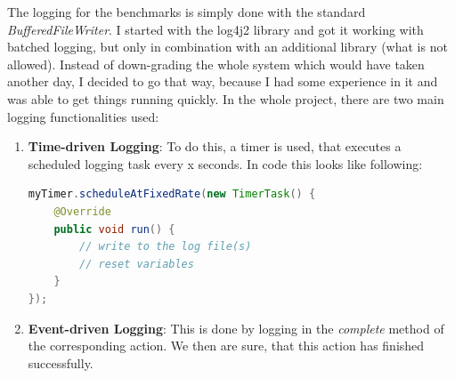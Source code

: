 \documentclass[11pt]{article}
\begin{document}
 The logging for the benchmarks is simply done with the standard \textit{BufferedFileWriter}. I started with the log4j2 library and got it working with batched logging, but only in combination with an additional library (what is not allowed). Instead of down-grading the whole system which would have taken another day, I decided to go that way, because I had some experience in it and was able to get things running quickly. In the whole project, there are two main logging functionalities used:
 \begin{enumerate}
 	\item \textbf{Time-driven Logging}: To do this, a timer is used, that executes a scheduled logging task every x seconds. In code this looks like following:
\begin{lstlisting}[basicstyle=\small, language=Java]
myTimer.scheduleAtFixedRate(new TimerTask() {
    @Override
    public void run() {
        // write to the log file(s)
        // reset variables
    }
});
\end{lstlisting}
	\item \textbf{Event-driven Logging}: This is done by logging in the \textit{complete} method of the corresponding action. We then are sure, that this action has finished successfully.
\end{enumerate}
 
\end{document}
